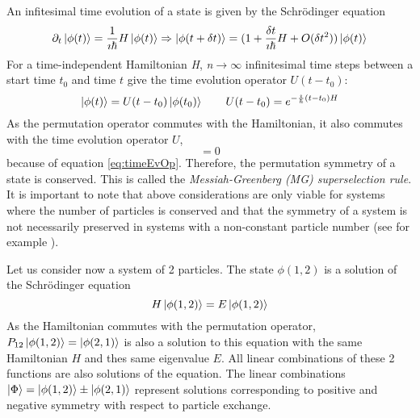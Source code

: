 An infitesimal time evolution of a state is given by the Schrödinger equation
\begin{equation}
 \partial_{t}\ket{\phi(t)} = \frac{1}{\imath\hbar} H \ket{\phi(t)} \Rightarrow \ket{\phi(t+\delta t)} = (1 + \frac{\delta t}{ \imath\hbar} H + O(\delta t^{2}))\ket{\phi(t)}
\end{equation} 
For a time-independent Hamiltonian \textit{H}, \textit{n}$\rightarrow \infty$ infinitesimal time steps between a start time $t_{0}$ and time $t$ give the time evolution operator $U(t-t_{0})$:
\begin{equation}
\label{eq:timeEvOp}
 \ket{\phi(t)} = U(t-t_{0})\ket{\phi(t_{0})} \hspace{2em} U(t-t_{0}) = e^{-\frac{\imath}{\hbar}(t-t_{0})H}
\end{equation} 
As the permutation operator commutes with the Hamiltonian, it also commutes with the time evolution operator $U$,
\begin{equation}
 [P,U] = 0
\end{equation} 
because of equation \ref{eq:timeEvOp}. Therefore, the permutation symmetry of a state is conserved. This is called the \textit{Messiah-Greenberg (MG) superselection rule}. It is important to note that above considerations are only viable for systems where the number of particles is conserved and that the symmetry of a system is not necessarily preserved in systems with a non-constant particle number (see for example \cite{Messiah1964}). 

Let us consider now a system of 2 particles. The state $\phi(1,2)$ is a solution of the Schrödinger equation
\begin{equation}
 H \ket{\phi(1,2)} = E \ket{\phi(1,2)}
\end{equation} 
As the Hamiltonian commutes with the permutation operator, $P_{12} \ket{\phi(1,2)} = \ket{\phi(2,1)}$ is also a solution to this equation with the same Hamiltonian $H$ and thes same eigenvalue $E$. All linear combinations of these 2 functions are also solutions of the equation. The linear combinations $\ket{\Phi} = \ket{\phi(1,2)} \pm \ket{\phi(2,1)}$ represent solutions corresponding to positive and negative symmetry with respect to particle exchange. 

